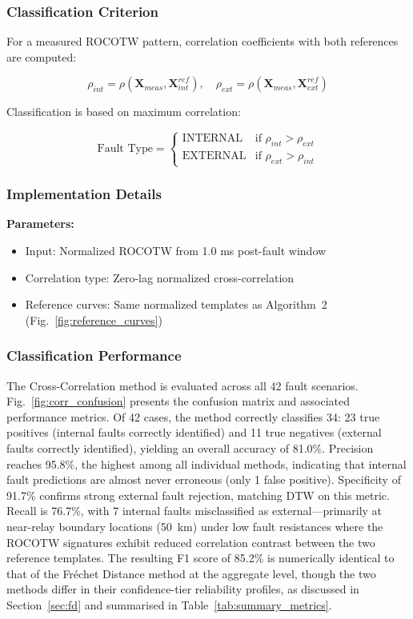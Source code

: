 \documentclass[journal]{IEEEtran}
\begin{document}
\subsubsection{Classification Criterion}

For a measured ROCOTW pattern, correlation coefficients with both references
are computed:

\begin{equation}
\rho_{int} = \rho(\mathbf{X}_{meas}, \mathbf{X}_{int}^{ref}), \quad
\rho_{ext} = \rho(\mathbf{X}_{meas}, \mathbf{X}_{ext}^{ref})
\end{equation}

Classification is based on maximum correlation:

\begin{equation}
\text{Fault Type} = \begin{cases}
\text{INTERNAL} & \text{if } \rho_{int} > \rho_{ext} \\
\text{EXTERNAL} & \text{if } \rho_{ext} > \rho_{int}
\end{cases}
\end{equation}

\subsubsection{Implementation Details}

\textbf{Parameters:}
\begin{itemize}
\item Input: Normalized ROCOTW from 1.0 ms post-fault window
\item Correlation type: Zero-lag normalized cross-correlation
\item Reference curves: Same normalized templates as Algorithm~2
      (Fig.~\ref{fig:reference_curves})
\end{itemize}

\subsubsection{Classification Performance}

The Cross-Correlation method is evaluated across all 42 fault scenarios.
Fig.~\ref{fig:corr_confusion} presents the confusion matrix and associated
performance metrics. Of 42 cases, the method correctly classifies 34:
23 true positives (internal faults correctly identified) and 11 true
negatives (external faults correctly identified), yielding an overall
accuracy of 81.0\%. Precision reaches 95.8\%, the highest among all
individual methods, indicating that internal fault predictions are almost
never erroneous (only 1 false positive). Specificity of 91.7\% confirms
strong external fault rejection, matching DTW on this metric. Recall
is 76.7\%, with 7 internal faults misclassified as external---primarily
at near-relay boundary locations (50~km) under low fault resistances
where the ROCOTW signatures exhibit reduced correlation contrast between
the two reference templates. The resulting F1 score of 85.2\% is numerically identical to that of
the Fr\'{e}chet Distance method at the aggregate level, though the two
methods differ in their confidence-tier reliability profiles,
as discussed in Section~\ref{sec:fd} and summarised in
Table~\ref{tab:summary_metrics}.
\end{document}
